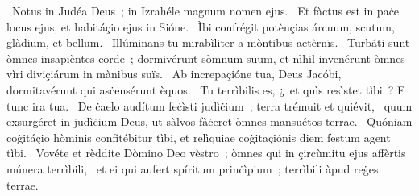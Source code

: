 \psalmChapterWithInscription{}
{ }
{%
~Notus in Judéa Deus~; in Izrahéle magnum nomen ejus. 
~Et fàctus est in paċe locus ejus, et habitáçio ejus in Sióne. 
~Ìbi confrégit potènçias árcuum, scutum, glàdium, et bellum. 
~Illúminans tu mirabìliter a mòntibus aetèrnïs. 
~Turbáti sunt òmnes insapièntes corde~; dormivérunt sòmnum suum, et nìhil invenérunt òmnes vìri diviçiárum in mànibus suïs. 
~Ab increpaçióne tua, Deus Jacóbi, dormitavérunt qui asċensérunt èquos. 
~Tu terrìbilis es, ¿~et quìs resìstet tìbi~? E tunc ira tua. 
~De ċaelo audítum feċìsti judìċium~; terra trémuit et quiévit, 
~quum exsurgéret in judìċium Deus, ut sàlvos fàċeret òmnes mansuétos terrae. 
~Quóniam coġitáçio hòminis confitébitur tìbi, et relìquiae coġitaçiónis diem festum agent tìbi. 
~Vovéte et rèddite Dòmino Deo vèstro~; òmnes qui in çircùmitu ejus affèrtis múnera terrìbili, 
~et ei qui aufert spíritum prinċìpium~; terrìbili àpud reġes terrae. 
}
